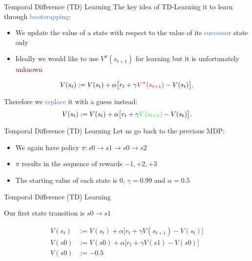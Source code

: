 \documentclass{beamer}
\begin{document}
\begin{frame}{Temporal Difference (TD) Learning}
	The key idea of TD-Learning it to learn through \textcolor{RoyalBlue}{bootsrapping}:
	\begin{itemize}
		\item We update the value of a state with respect to the value of its \textcolor{RoyalBlue}{successor} state only
		\item Ideally we would like to use $V^{\pi}(s_{t+1})$ for learning but it is unfortunately \textcolor{Maroon}{unknown}
	\end{itemize}
	
	\begin{align*}
		V(s_t):= V(s_t) + \alpha \big[r_t + \gamma \textcolor{red}{V^{\pi}(s_{t+1})} - V(s_t)\big].
	\end{align*}


	Therefore we \textcolor{RoyalBlue}{replace} it with a guess instead:
	\begin{align*}
		V(s_t):= V(s_t) + \alpha \big[r_t + \gamma \textcolor{green}{V(s_{t+1})} - V(s_t)\big].
	\end{align*}
	
\end{frame}

\begin{frame}{Temporal Difference (TD) Learning}
	Let us go back to the previous MDP:
	\begin{center}
	
	\end{center}

	\begin{itemize}
		\item We again have policy $\pi: s0\rightarrow s1 \rightarrow s0 \rightarrow s2$
		\item $\pi$ results in the sequence of rewards $-1, +2, +3$
		\item The starting value of each state is $0$, $\gamma=0.99$ and $\alpha=0.5$
	\end{itemize}
	
\end{frame}


\begin{frame}{Temporal Difference (TD) Learning}
	\begin{center}
	
	\end{center}

	Our first state transition is $s0 \rightarrow s1$

	\begin{align*}
		V(s_t) & := V(s_t) + \alpha \big[r_t + \gamma V(s_{t+1}) - V(s_t)\big] \\
		V(s0) & := V(s0) + \alpha \big[r_t + \gamma V(s1) - V(s0)\big] \\ 
		V(s0) & := -0.5
	\end{align*}

\end{frame}
\end{document}
